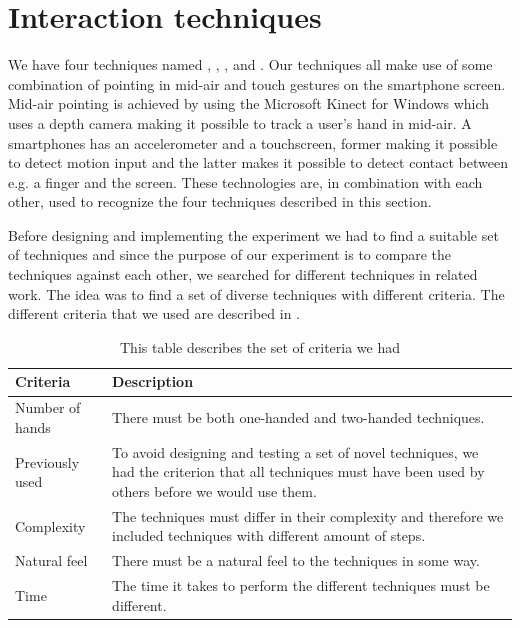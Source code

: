 \section{Interaction techniques} \label{sec:techniques}
We have four techniques named \swipe, \tilt, \throw, and \pinch.
Our techniques all make use of some combination of pointing in mid-air and touch gestures on the smartphone screen.
Mid-air pointing is achieved by using the Microsoft Kinect for Windows which uses a depth camera making it possible to track a user's hand in mid-air.
A smartphones has an accelerometer and a touchscreen, former making it possible to detect motion input and the latter makes it possible to detect contact between e.g. a finger and the screen.
These technologies are, in combination with each other, used to recognize the four techniques described in this section. 

Before designing and implementing the experiment we had to find a suitable set of techniques and since the purpose of our experiment is to compare the techniques against each other, we searched for different techniques in related work.
The idea was to find a set of diverse techniques with different criteria.
The different criteria that we used are described in .

\begin{table}[H]
	\centering
	\begin{tabular}{|p{}|p{}|}
		\hline
		\rowcolor[HTML]{9B9B9B} 
		\textbf{Criteria} & \textbf{Description} \\ \hline
		Number of hands & There must be both one-handed and two-handed techniques. \\ \hline
		Previously used & To avoid designing and testing a set of novel techniques, we had the criterion that all techniques must have been used by others before we would use them. \\ \hline
		Complexity & The techniques must differ in their complexity and therefore we included techniques with different amount of steps. \\ \hline
		Natural feel & There must be a natural feel to the techniques in some way. \\ \hline
		Time & The time it takes to perform the different techniques must be different. \\ \hline
	\end{tabular}
	\caption{This table describes the set of criteria we had }
	\label{tab:techniqueCriteria}
\end{table}

